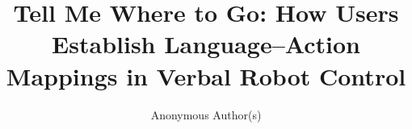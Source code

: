 \documentclass[sigconf,review,anonymous]{acmart}
\begin{document}
\title[Tell Me Where to Go]{Tell Me Where to Go: How Users Establish Language–Action Mappings in Verbal Robot Control}

\author{Anonymous Author(s)}


\end{document}
